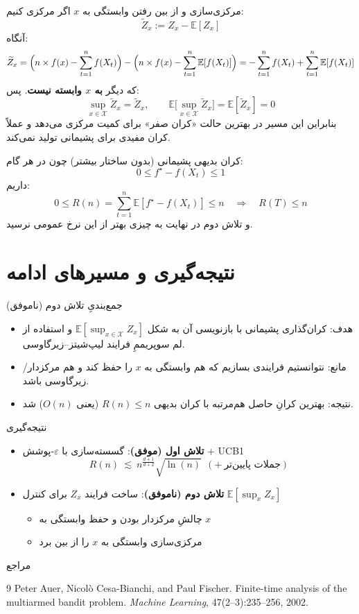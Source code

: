 \documentclass[aspectratio=169]{beamer}
\newcommand{\E}{\mathbb{E}}
\newcommand{\cX}{\mathcal{X}}
\newcommand{\eps}{\varepsilon}
\begin{document}
\begin{frame}{مرکزی‌سازی و از بین رفتن وابستگی به $x$}
اگر مرکزی کنیم:
\[
\widetilde{Z}_x:=Z_x-\E[Z_x]
\]
آنگاه:
\[
\widetilde{Z}_x
=
\Bigl(n \times f(x)-\sum_{t=1}^n f(X_t)\Bigr)
-
\Bigl(n \times f(x)-\sum_{t=1}^n \E[f(X_t)]\Bigr)
=
-\sum_{t=1}^n f(X_t)+\sum_{t=1}^n \E[f(X_t)]
\]
که دیگر \textbf{به $x$ وابسته نیست}. پس:
\[
\sup_{x\in\cX}\widetilde{Z}_x=\widetilde{Z}_x,\qquad
\E\Big[\sup_{x\in\cX}\widetilde{Z}_x\Big]=\E[\widetilde{Z}_x]=0
\]
بنابراین این مسیر در بهترین حالت «کران صفر» برای کمیت مرکزی می‌دهد و عملاً کران مفیدی برای پشیمانی تولید نمی‌کند.
\end{frame}

\begin{frame}{کران بدیهی پشیمانی (بدون ساختار بیشتر)}
چون در هر گام:
\[
0\le f^\star-f(X_t)\le 1
\]
داریم:
\[
0\le R(n)=\sum_{t=1}^n \E[f^\star-f(X_t)]\le n
\quad\Rightarrow\quad
R(T) \le n
\]
و تلاش دوم در نهایت به چیزی بهتر از این نرخ عمومی نرسید.
\end{frame}

\section{نتیجه‌گیری و مسیرهای ادامه}


\begin{frame}{جمع‌بندیِ تلاش دوم (ناموفق)}
\begin{itemize}
  \item هدف: کران‌گذاری پشیمانی با بازنویسی آن به شکل $\E[\sup_{x\in\mathcal{X}} Z_x]$ و استفاده از لم سوپریممِ فرایند لیپ‌شیتز–زیرگاوسی.
  \item مانع: نتوانستیم فرایندی بسازیم که هم وابستگی به $x$ را حفظ کند و هم مرکزدار/زیرگاوسی باشد.
  \item نتیجه: بهترین کرانِ حاصل هم‌مرتبه با کران بدیهی $R(n)\le n$ (یعنی $O(n)$) شد.
\end{itemize}
\end{frame}

\begin{frame}{نتیجه‌گیری}
\begin{itemize}
  \item \textbf{تلاش اول (موفق)}: گسسته‌سازی با $\eps$-پوشش + UCB1
  \[
  R(n)\ \lesssim\ n^{\frac{d+1}{d+2}}\sqrt{\ln (n)}\ \ (+\ \text{جملات پایین‌تر})
  \]
  \item \textbf{تلاش دوم (ناموفق)}: ساخت فرایند $Z_x$ برای کنترل $\E[\sup_x Z_x]$
  \begin{itemize}
    \item چالشِ مرکزدار بودن و حفظ وابستگی به $x$
    \item مرکزی‌سازی وابستگی به $x$ را از بین برد
  \end{itemize}
\end{itemize}
\end{frame}

\begin{frame}{مراجع}
\begin{thebibliography}{9}
Peter Auer, Nicol\`o Cesa-Bianchi, and Paul Fischer.
\newblock Finite-time analysis of the multiarmed bandit problem.
\newblock \emph{Machine Learning}, 47(2--3):235--256, 2002.
\end{thebibliography}
\end{frame}
\end{document}
